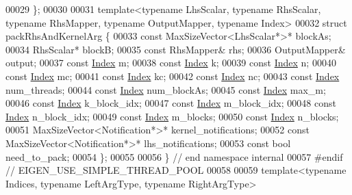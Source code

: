 \begin{DoxyCode}
00029 \};
00030 
00031 \textcolor{keyword}{template}<\textcolor{keyword}{typename} LhsScalar, \textcolor{keyword}{typename} RhsScalar, \textcolor{keyword}{typename} RhsMapper, \textcolor{keyword}{typename} OutputMapper, \textcolor{keyword}{typename} Index>
00032 \textcolor{keyword}{struct }packRhsAndKernelArg \{
00033   \textcolor{keyword}{const} MaxSizeVector<LhsScalar*>* blockAs;
00034   RhsScalar* blockB;
00035   \textcolor{keyword}{const} RhsMapper& rhs;
00036   OutputMapper& output;
00037   \textcolor{keyword}{const} \hyperlink{namespace_eigen_a62e77e0933482dafde8fe197d9a2cfde}{Index} m;
00038   \textcolor{keyword}{const} \hyperlink{namespace_eigen_a62e77e0933482dafde8fe197d9a2cfde}{Index} k;
00039   \textcolor{keyword}{const} \hyperlink{namespace_eigen_a62e77e0933482dafde8fe197d9a2cfde}{Index} n;
00040   \textcolor{keyword}{const} \hyperlink{namespace_eigen_a62e77e0933482dafde8fe197d9a2cfde}{Index} mc;
00041   \textcolor{keyword}{const} \hyperlink{namespace_eigen_a62e77e0933482dafde8fe197d9a2cfde}{Index} kc;
00042   \textcolor{keyword}{const} \hyperlink{namespace_eigen_a62e77e0933482dafde8fe197d9a2cfde}{Index} nc;
00043   \textcolor{keyword}{const} \hyperlink{namespace_eigen_a62e77e0933482dafde8fe197d9a2cfde}{Index} num\_threads;
00044   \textcolor{keyword}{const} \hyperlink{namespace_eigen_a62e77e0933482dafde8fe197d9a2cfde}{Index} num\_blockAs;
00045   \textcolor{keyword}{const} \hyperlink{namespace_eigen_a62e77e0933482dafde8fe197d9a2cfde}{Index} max\_m;
00046   \textcolor{keyword}{const} \hyperlink{namespace_eigen_a62e77e0933482dafde8fe197d9a2cfde}{Index} k\_block\_idx;
00047   \textcolor{keyword}{const} \hyperlink{namespace_eigen_a62e77e0933482dafde8fe197d9a2cfde}{Index} m\_block\_idx;
00048   \textcolor{keyword}{const} \hyperlink{namespace_eigen_a62e77e0933482dafde8fe197d9a2cfde}{Index} n\_block\_idx;
00049   \textcolor{keyword}{const} \hyperlink{namespace_eigen_a62e77e0933482dafde8fe197d9a2cfde}{Index} m\_blocks;
00050   \textcolor{keyword}{const} \hyperlink{namespace_eigen_a62e77e0933482dafde8fe197d9a2cfde}{Index} n\_blocks;
00051   MaxSizeVector<Notification*>* kernel\_notifications;
00052   \textcolor{keyword}{const} MaxSizeVector<Notification*>* lhs\_notifications;
00053   \textcolor{keyword}{const} \textcolor{keywordtype}{bool} need\_to\_pack;
00054 \};
00055 
00056 \}  \textcolor{comment}{// end namespace internal}
00057 \textcolor{preprocessor}{#endif  // EIGEN\_USE\_SIMPLE\_THREAD\_POOL}
00058 
00059 \textcolor{keyword}{template}<\textcolor{keyword}{typename} Indices, \textcolor{keyword}{typename} LeftArgType, \textcolor{keyword}{typename} RightArgType>

\end{DoxyCode}
